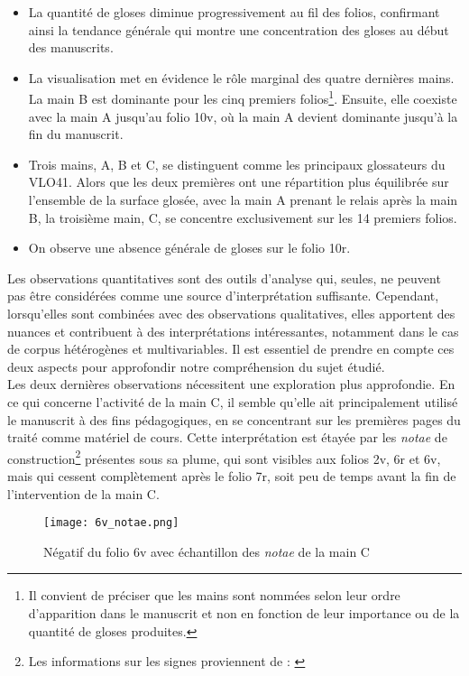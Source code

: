 \documentclass[a4paper, twoside, 12pt]{book}
\begin{document}
{\begin{itemize}
\item La quantité de gloses diminue progressivement au fil des folios, confirmant ainsi la tendance générale qui montre une concentration des gloses au début des manuscrits.
\item La visualisation met en évidence le rôle marginal des quatre dernières mains. La main B est dominante pour les cinq premiers folios\footnote{Il convient de préciser que les mains sont nommées selon leur ordre d'apparition dans le manuscrit et non en fonction de leur importance ou de la quantité de gloses produites.}. Ensuite, elle coexiste avec la main A jusqu'au folio 10v, où la main A devient dominante jusqu'à la fin du manuscrit.
\item Trois mains, A, B et C, se distinguent comme les principaux glossateurs du VLO41. Alors que les deux premières ont une répartition plus équilibrée sur l'ensemble de la surface glosée, avec la main A prenant le relais après la main B, la troisième main, C, se concentre exclusivement sur les 14 premiers folios.
\item On observe une absence générale de gloses sur le folio 10r.
\end{itemize}

Les observations quantitatives sont des outils d'analyse qui, seules, ne peuvent pas être considérées comme une source d'interprétation suffisante. Cependant, lorsqu'elles sont combinées avec des observations qualitatives, elles apportent des nuances et contribuent à des interprétations intéressantes, notamment dans le cas de corpus hétérogènes et multivariables. Il est essentiel de prendre en compte ces deux aspects pour approfondir notre compréhension du sujet étudié. \\

Les deux dernières observations nécessitent une exploration plus approfondie. En ce qui concerne l'activité de la main C, il semble qu'elle ait principalement utilisé le manuscrit à des fins pédagogiques, en se concentrant sur les premières pages du traité comme matériel de cours. Cette interprétation est étayée par les \textit{notae} de construction\footnote{Les informations sur les signes proviennent de : \cite{steinova2016notam}} présentes sous sa plume, qui sont visibles aux folios 2v, 6r et 6v, mais qui cessent complètement après le folio 7r, soit peu de temps avant la fin de l'intervention de la main C.\\

\begin{figure}[H]
    \centering
    \texttt{[image: 6v\_notae.png]}
    \caption{Négatif du folio 6v avec échantillon des \textit{notae} de la main C}
\end{figure}

}
\end{document}
